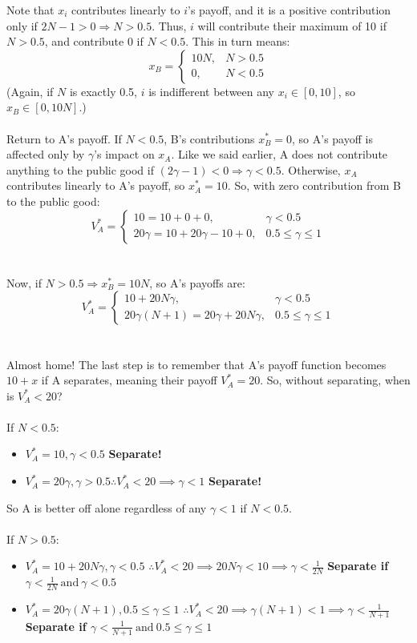 \documentclass[10pt]{article}
\begin{document}
Note that $x_i$ contributes linearly to $i$'s payoff, and it is a positive contribution only if $2N - 1 > 0 \Longrightarrow N > 0.5$. Thus, $i$ will contribute their maximum of 10 if $N > 0.5$, and contribute 0 if $N < 0.5$. This in turn means:
\[
x_B = \begin{cases}
	10N, & N > 0.5 \\
	0, & N < 0.5
\end{cases}
\]
(Again, if $N$ is exactly 0.5, $i$ is indifferent between any $x_i \in \left[0, 10\right]$, so $x_B \in \left[0, 10N\right]$.)
\\ \\
Return to A's payoff. If $N < 0.5$, B's contributions $x_B^* = 0$, so A's payoff is affected only by $\gamma$'s impact on $x_A$.
Like we said earlier, A does not contribute anything to the public good if $(2\gamma - 1) < 0 \Longrightarrow \gamma < 0.5$. Otherwise, $x_A$ contributes linearly to A's payoff, so $x_A^* = 10$. So, with zero contribution from B to the public good:
\[
V_A^* = \begin{cases}
	10 = 10 + 0 + 0, & \gamma < 0.5 \\
	20\gamma = 10 + 20\gamma - 10 + 0, & 0.5 \leq \gamma \leq 1
\end{cases}
\]
\\ \\
Now, if $N > 0.5 \Longrightarrow x_B^* = 10N$, so A's payoffs are:
\[
V_A^* = \begin{cases}
	10 + 20N\gamma, & \gamma < 0.5 \\
	20\gamma(N+1) = 20\gamma + 20N\gamma, & 0.5 \leq \gamma \leq 1
\end{cases}
\]
\\ \\
Almost home! The last step is to remember that A's payoff function becomes $10 + x$ if A separates, meaning their payoff $V_A^* = 20$. So, without separating, when is $V_A^* < 20$?
\\ \\
If $N < 0.5$:
\begin{itemize}
	\item $V_A^* = 10, \gamma < 0.5$ \textbf{Separate!}
	\item $V_A^* = 20\gamma, \gamma > 0.5 \therefore V_A^* < 20 \implies \gamma < 1$ \textbf{Separate!}
\end{itemize}
So A is better off alone regardless of any $\gamma < 1$ if $N < 0.5$.
\\ \\
If $N > 0.5$:
\begin{itemize}
	\item $V_A^* = 10 + 20N\gamma, \gamma < 0.5$
	\subitem $\therefore V_A^* < 20 \implies 20N\gamma < 10 \implies \gamma < \frac{1}{2N}$ 
	\subitem \textbf{Separate if $\gamma < \frac{1}{2N} \ \text{and} \ \gamma < 0.5$}
	\item $V_A^* = 20\gamma(N+1), 0.5 \leq \gamma \leq 1$
	\subitem $\therefore V_A^* < 20 \implies \gamma(N+1) < 1 \implies \gamma < \frac{1}{N+1}$ 
	\subitem \textbf{Separate if $\gamma < \frac{1}{N+1} \ \text{and} \ 0.5 \leq  \gamma \leq 1$}
\end{itemize}
\end{document}
